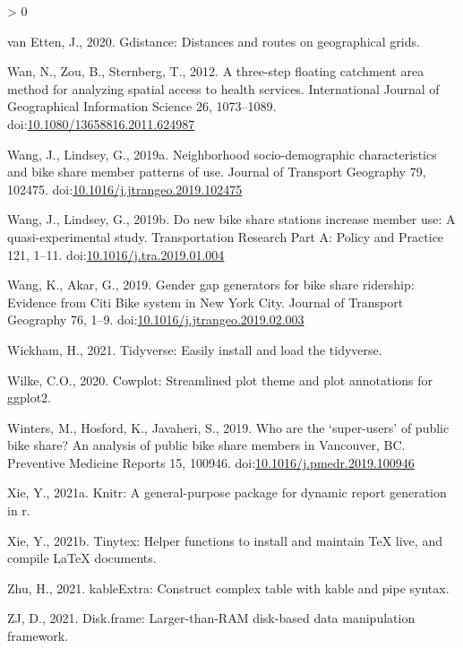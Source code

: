 \documentclass[]{elsarticle} %
\newlength{\cslhangindent}
\newenvironment{CSLReferences}[2] %
 {%
  \setlength{\parindent}{0pt}
  \ifodd #1 \everypar{\setlength{\hangindent}{\cslhangindent}}\ignorespaces\fi
  \ifnum #2 > 0
  \setlength{\parskip}{#2\baselineskip}
  \fi
 }%
 {}
\begin{document}
\begin{CSLReferences}{1}{0}
\leavevmode\hypertarget{ref-R-gdistance}{}%
van Etten, J., 2020. Gdistance: Distances and routes on geographical
grids.

\leavevmode\hypertarget{ref-wanThreestepFloatingCatchment2012}{}%
Wan, N., Zou, B., Sternberg, T., 2012. A three-step floating catchment
area method for analyzing spatial access to health services.
International Journal of Geographical Information Science 26,
1073--1089.
doi:\href{https://doi.org/10.1080/13658816.2011.624987}{10.1080/13658816.2011.624987}

\leavevmode\hypertarget{ref-wangNeighborhoodSociodemographicCharacteristics2019}{}%
Wang, J., Lindsey, G., 2019a. Neighborhood socio-demographic
characteristics and bike share member patterns of use. Journal of
Transport Geography 79, 102475.
doi:\href{https://doi.org/10.1016/j.jtrangeo.2019.102475}{10.1016/j.jtrangeo.2019.102475}

\leavevmode\hypertarget{ref-wangNewBikeShare2019}{}%
Wang, J., Lindsey, G., 2019b. Do new bike share stations increase member
use: {A} quasi-experimental study. Transportation Research Part A:
Policy and Practice 121, 1--11.
doi:\href{https://doi.org/10.1016/j.tra.2019.01.004}{10.1016/j.tra.2019.01.004}

\leavevmode\hypertarget{ref-wangGenderGapGenerators2019}{}%
Wang, K., Akar, G., 2019. Gender gap generators for bike share
ridership: {Evidence} from {Citi Bike} system in {New York City}.
Journal of Transport Geography 76, 1--9.
doi:\href{https://doi.org/10.1016/j.jtrangeo.2019.02.003}{10.1016/j.jtrangeo.2019.02.003}

\leavevmode\hypertarget{ref-R-tidyverse}{}%
Wickham, H., 2021. Tidyverse: Easily install and load the tidyverse.

\leavevmode\hypertarget{ref-R-cowplot}{}%
Wilke, C.O., 2020. Cowplot: Streamlined plot theme and plot annotations
for ggplot2.

\leavevmode\hypertarget{ref-wintersWhoAreSuperusers2019}{}%
Winters, M., Hosford, K., Javaheri, S., 2019. Who are the
{`super-users'} of public bike share? {An} analysis of public bike share
members in {Vancouver}, {BC}. Preventive Medicine Reports 15, 100946.
doi:\href{https://doi.org/10.1016/j.pmedr.2019.100946}{10.1016/j.pmedr.2019.100946}

\leavevmode\hypertarget{ref-R-knitr}{}%
Xie, Y., 2021a. Knitr: A general-purpose package for dynamic report
generation in r.

\leavevmode\hypertarget{ref-R-tinytex}{}%
Xie, Y., 2021b. Tinytex: Helper functions to install and maintain TeX
live, and compile LaTeX documents.

\leavevmode\hypertarget{ref-R-kableExtra}{}%
Zhu, H., 2021. kableExtra: Construct complex table with kable and pipe
syntax.

\leavevmode\hypertarget{ref-R-disk.frame}{}%
ZJ, D., 2021. Disk.frame: Larger-than-RAM disk-based data manipulation
framework.

\end{CSLReferences}
\end{document}
